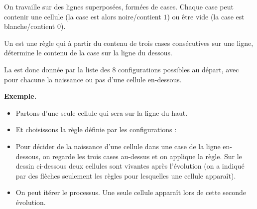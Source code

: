 \documentclass[11pt,class=report,crop=false]{standalone}
\begin{document}

\begin{cours}

On travaille sur des lignes superposées, formées de cases.
Chaque case peut contenir une cellule (la case est alors noire/contient $1$) ou être vide (la case est blanche/contient $0$).



Un  est une règle qui à partir du contenu de trois cases consécutives sur une ligne, détermine le contenu de la case sur la ligne du dessous.

La  est donc donnée par la liste des $8$ configurations possibles au départ, avec pour chacune la naissance ou pas d'une cellule en-dessous.





\textbf{Exemple.}
\begin{itemize}
  \item Partons d'une seule cellule qui sera sur la ligne du haut.
 
  
  
  \item Et choisissons la règle définie par les configurations : \\
  
    
   \item Pour décider de la naissance d'une cellule dans une case de la ligne en-dessous, on regarde les trois cases au-dessus et on applique la règle. Sur le dessin
 ci-dessous deux cellules sont vivantes après l'évolution (on a indiqué par des flèches seulement les règles pour lesquelles une cellule apparaît). \\
   

 \item On peut itérer le processus. Une seule cellule apparaît lors de cette seconde évolution.
 

      
\end{itemize}
 

\end{cours}
\end{document}
